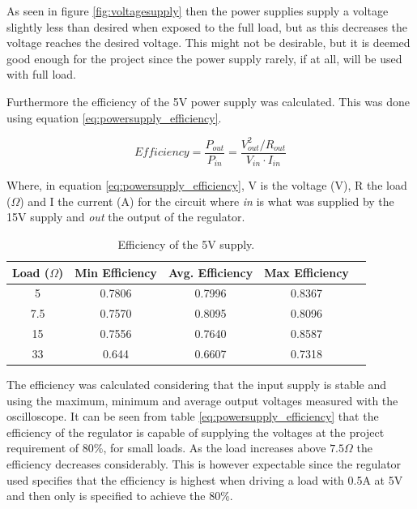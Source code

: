 As seen in figure \ref{fig:voltagesupply} then the power supplies supply a voltage slightly less than desired when exposed to the full load, but as this decreases the voltage reaches the desired voltage.
This might not be desirable, but it is deemed good enough for the project since the power supply rarely, if at all, will be used with full load.


Furthermore the efficiency of the 5V power supply was calculated.
This was done using equation \ref{eq:powersupply_efficiency}.

\begin{equation}
Efficiency = \frac{P_{out}}{P_{in}} = \frac{V_{out}^2 / R_{out}}{V_{in} \cdot I_{in}}
\label{eq:powersupply_efficiency}
\end{equation}

Where, in equation \ref{eq:powersupply_efficiency}, V is the voltage (V), R the load ($\Omega$) and I the current (A) for the circuit where \textit{in} is what was supplied by the 15V supply and \textit{out} the output of the regulator.


\begin{table}[H]
\centering
\begin{tabular}{|c|c|c|c|c|}
\hline
Load ($\Omega$) & Min Efficiency & Avg. Efficiency & Max Efficiency \\ \hline
5 & 0.7806 & 0.7996 & 0.8367 \\ \hline
7.5 & 0.7570 & 0.8095 & 0.8096 \\ \hline
15 & 0.7556 & 0.7640 & 0.8587 \\ \hline
33 & 0.644 & 0.6607 & 0.7318 \\ \hline
\end{tabular}
\caption{Efficiency of the 5V supply.}
\label{tab:voltageefficiency}
\end{table}

The efficiency was calculated considering that the input supply is stable and using the maximum, minimum and average output voltages measured with the oscilloscope.
It can be seen from table \ref{eq:powersupply_efficiency} that the efficiency of the regulator is capable of supplying the voltages at the project requirement of 80\%, for small loads.
As the load increases above $7.5\Omega$ the efficiency decreases considerably.
This is however expectable since the regulator used specifies that the efficiency is highest when driving a load with 0.5A at 5V and then only is specified to achieve the 80\%.
